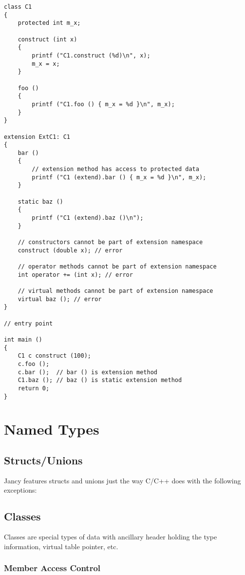 \documentclass[oneside]{book}
\begin{document}
\begin{lstlisting}
class C1
{
    protected int m_x;

    construct (int x)
    {
        printf ("C1.construct (%d)\n", x);
        m_x = x;
    }

    foo ()
    {
        printf ("C1.foo () { m_x = %d }\n", m_x);
    }
}

extension ExtC1: C1
{
    bar ()
    {
        // extension method has access to protected data
        printf ("C1 (extend).bar () { m_x = %d }\n", m_x); 
    }

    static baz ()
    {
        printf ("C1 (extend).baz ()\n");
    }

    // constructors cannot be part of extension namespace
    construct (double x); // error

    // operator methods cannot be part of extension namespace
    int operator += (int x); // error

    // virtual methods cannot be part of extension namespace
    virtual baz (); // error
}

// entry point

int main ()
{
    C1 c construct (100);
    c.foo ();            
    c.bar ();  // bar () is extension method
    C1.baz (); // baz () is static extension method
    return 0;
}
\end{lstlisting}

\section{Named Types}

\subsection{Structs/Unions}

Jancy features structs and unions just the way C/C++ does with the following exceptions:



\subsection{Classes}

Classes are special types of data with ancillary header holding the type information, virtual table pointer, etc.

\subsubsection{Member Access Control}
\end{document}
